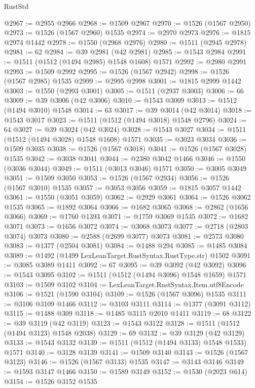 \begin{lexlean}{RustStd}
\begin{coremodule}
{{@2967 := @2955 @2966
@2968 := @1509 @2967
@2970 := @1526 (@1567 @2950)
@2973 := @1526 (@1567 @2960) @1535
@2974 := @2970 @2973
@2976 := @1815 @2974 @1442
@2978 := @1550 (@2968 @2976)
@2980 := @1511 (@2945 @2978)
@2981 := 62
@2984 := @39 @2981 (@42 @2981)
@2985 := @1543 @2984
@2991 := @1511 (@1512 (@1494 @2985) @1548 @1608) @1571
@2992 := @2980 @2991
@2993 := @1509 @2992
@2995 := @1526 (@1567 @2942)
@2998 := @1526 (@1567 @2985) @1535
@2999 := @2995 @2998
@3001 := @1815 @2999 @1442
@3003 := @1550 (@2993 @3001)
@3005 := @1511 (@2937 @3003)
@3006 := 66
@3009 := @39 @3006 (@42 @3006)
@3010 := @1543 @3009
@3013 := @1512 (@1494 @3010) @1548
@3014 := 63
@3017 := @39 @3014 (@42 @3014)
@3018 := @1543 @3017
@3023 := @1511 (@1512 (@1494 @3018) @1548 @2796)
@3024 := 64
@3027 := @39 @3024 (@42 @3024)
@3028 := @1543 @3027
@3034 := @1511 (@1512 (@1494 @3028) @1548 @1608) @1571
@3035 := @3023 @3034
@3036 := @1509 @3035
@3038 := @1526 (@1567 @3018)
@3041 := @1526 (@1567 @3028) @1535
@3042 := @3038 @3041
@3044 := @2380 @3042 @1466
@3046 := @1550 (@3036 @3044)
@3049 := @1511 (@3013 @3046) @1571
@3050 := @3005 @3049
@3051 := @1509 @3050
@3053 := @1526 (@1567 @2934)
@3056 := @1526 (@1567 @3010) @1535
@3057 := @3053 @3056
@3059 := @1815 @3057 @1442
@3061 := @1550 (@3051 @3059)
@3062 := @2929 @3061
@3064 := @1526 @3062 @1535
@3065 := @1892 @3064
@3066 := @1682 @3065
@3068 := @2862 (@1656 @3066)
@3069 := @1760 @1393
@3071 := @1759 @3069 @1535
@3072 := @1682 @3071
@3073 := @1656 @3072
@3074 := @3068 @3073
@3077 := @2718 (@2803 @3074) @3073
@3080 := @2588 (@2699 @3077) @3073
@3081 := @2573 @3080
@3083 := @1377 (@2504 @3081)
@3084 := @1488 @294
@3085 := @1485 @3084
@3089 := @1492 (@1499 LexLeanTarget.RustSyntax.RustType.str) @1502
@3091 := @3085 @3089 @1411
@3092 := 67
@3095 := @39 @3092 (@42 @3092)
@3096 := @1543 @3095
@3102 := @1511 (@1512 (@1494 @3096) @1548 @1659) @1571
@3103 := @1509 @3102
@3104 := LexLeanTarget.RustSyntax.Item.utf8Encode
@3106 := @1521 (@1590 @3104)
@3109 := @1526 (@1567 @3096) @1535
@3111 := @3106 @3109 @1466
@3112 := @3103 @3111
@3114 := @1377 (@3091 @3112)
@3115 := @1488 @309
@3118 := @1485 @3115 @2010 @1411
@3119 := 68
@3122 := @39 @3119 (@42 @3119)
@3123 := @1543 @3122
@3128 := @1511 (@1512 (@1494 @3123) @1548 @2038)
@3129 := 69
@3132 := @39 @3129 (@42 @3129)
@3133 := @1543 @3132
@3139 := @1511 (@1512 (@1494 @3133) @1548 @1533) @1571
@3140 := @3128 @3139
@3141 := @1509 @3140
@3143 := @1526 (@1567 @3123)
@3146 := @1526 (@1567 @3133) @1535
@3147 := @3143 @3146
@3149 := @1593 @3147 @1466
@3150 := @1589 @3149
@3152 := @1530 (@2023 @614)
@3154 := @1526 @3152 @1535
}}
\end{coremodule}
\end{lexlean}
